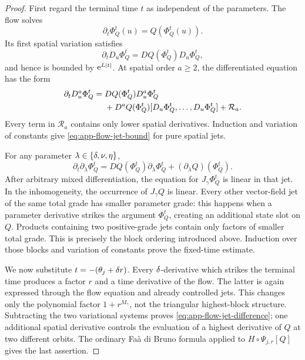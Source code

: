 \begin{proof}
First regard the terminal time \(t\) as independent of the parameters.
The flow solves
\[
 \partial_t\Phi_Q^t(u)=Q(\Phi_Q^t(u)).
\]
Its first spatial variation satisfies
\begin{equation}
\label{eq:app-first-variation}
 \partial_tD_u\Phi_Q^t
 =DQ(\Phi_Q^t)D_u\Phi_Q^t,
\end{equation}
and hence is bounded by \(\mathrm e^{L\left\lvert t\right\rvert}\).  At spatial order \(a\geq2\),
the differentiated equation has the form
\begin{align}
\label{eq:app-higher-variation}
 \partial_tD_u^a\Phi_Q^t
 ={}&DQ(\Phi_Q^t)D_u^a\Phi_Q^t\notag\\
 &+D^aQ(\Phi_Q^t)
   [D_u\Phi_Q^t,\ldots,D_u\Phi_Q^t]
   +\mathcal R_a.
\end{align}
Every term in \(\mathcal R_a\) contains only lower spatial derivatives.
Induction and variation of constants give
\cref{eq:app-flow-jet-bound} for pure spatial jets.

For any parameter \(\lambda\in\{\delta,\nu,\eta\}\),
\begin{equation}
\label{eq:app-parameter-variation}
 \partial_t\partial_\lambda\Phi_Q^t
 =DQ(\Phi_Q^t)\partial_\lambda\Phi_Q^t
  +(\partial_\lambda Q)(\Phi_Q^t).
\end{equation}
After arbitrary mixed differentiation, the equation for
\(J_\gamma\Phi_Q^t\) is linear in that jet.  In the inhomogeneity, the
occurrence of \(J_\gamma Q\) is linear.  Every other vector-field jet of
the same total grade has smaller parameter grade: this happens when a
parameter derivative strikes the argument \(\Phi_Q^t\), creating an
additional state slot on \(Q\).  Products containing two positive-grade
jets contain only factors of smaller total grade.  This is precisely the
block ordering introduced above.  Induction over those blocks and
variation of constants prove the fixed-time estimate.

We now substitute \(t=-(\theta_j+\delta r)\).  Every \(\delta\)-derivative
which strikes the terminal time produces a factor \(r\) and a time
derivative of the flow.  The latter is again expressed through the flow
equation and already controlled jets.  This changes only the polynomial
factor \(1+r^{M_\gamma}\), not the triangular highest-block structure.
Subtracting the two variational systems proves
\cref{eq:app-flow-jet-difference}; one additional spatial derivative
controls the evaluation of a highest derivative of \(Q\) at two different
orbits.  The ordinary Faà di Bruno formula applied to
\(H\circ\Psi_{j,r}[Q]\) gives the last assertion.
\end{proof}

